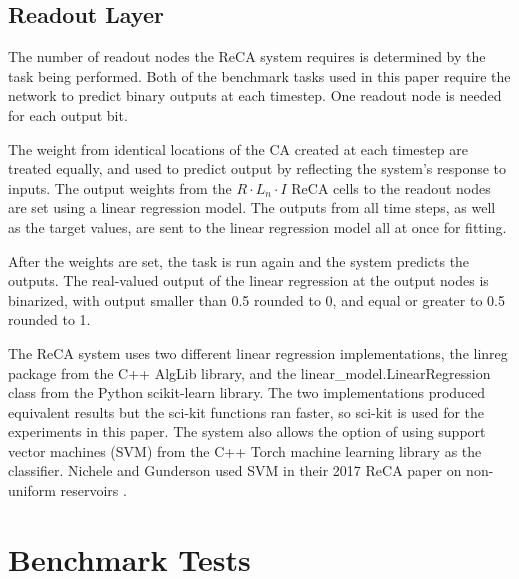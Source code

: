 \documentclass{elsarticle}
\begin{document}
\begin{multicols}{2}
	\subsection{Readout Layer}
	The number of readout nodes the ReCA system requires is determined by the task 
	being  performed. Both of the benchmark tasks used in this paper require the 
	network to predict binary outputs at each timestep. One readout node is needed 
	for each output bit. \par The weight from identical locations of the CA created 
	at each timestep are treated equally, and used to predict output by 
	reflecting the system's response to inputs. The output weights from the 
	$R \cdot L_{n} \cdot I$ ReCA cells to the readout nodes are set using a 
	linear regression model.  The outputs from all time steps, as well as the 
	target values, are sent to the linear regression model all at once for 
	fitting.  \par
	After the weights are set, the task is run again and the system predicts the 
	outputs. The real-valued output of the linear regression at the output nodes is 
	binarized, with output smaller than 0.5 rounded to 0, and equal or greater to 
	0.5 rounded to 1. \par The ReCA system uses two different linear regression 
	implementations, the linreg package from the C++ AlgLib library, and the 
	linear\_model.LinearRegression class from the Python scikit-learn library.  The 
	two implementations produced equivalent results but the sci-kit functions ran 
	faster, so sci-kit is used for the experiments in this paper. The system also 
	allows the option of  using support vector machines (SVM) from the C++ Torch 
	machine learning library as the classifier.  Nichele and 
	Gunderson used SVM in their 2017 ReCA paper on non-uniform 
	reservoirs \cite{nichele2017reservoir}.
	
	\section{Benchmark Tests}\label{Benchmarks}

\end{multicols}
\end{document}

